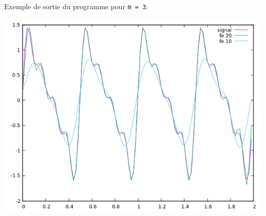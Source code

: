 \documentclass[11pt]{article}
\begin{document}
\vspace{20pt}

Exemple de sortie du programme pour \texttt{m = 3}:
\begin{center}
\includegraphics[scale=0.75]{Figures/Result.png}
\end{center}
\end{document}
